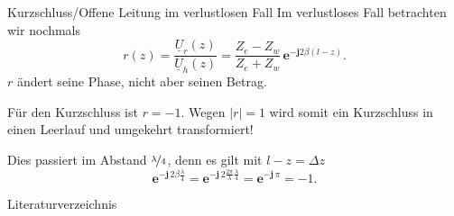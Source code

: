 \documentclass{beamer}
\begin{document}
\begin{frame}{Kurzschluss/Offene Leitung im verlustlosen Fall}
Im verlustloses Fall betrachten wir nochmals
\[
r(z) = \frac{\underline{U}_{r}(z)}{\underline{U}_{h}(z)} =
\frac{Z_{e}-Z_{w}}{Z_{e}+Z_{w}} \, \mathbf{e}^{-\mathbf{j} 2 \beta (l-z)}.
\]
$r$ ändert seine Phase, nicht aber seinen Betrag.
\vspace{1ex}

Für den Kurzschluss ist $r=-1$. Wegen $|r|=1$ wird somit ein Kurzschluss in einen Leerlauf und
umgekehrt transformiert!

\vspace{1ex}
Dies passiert im Abstand $\nicefrac{\lambda}{4}$, denn es gilt mit $l - z = \Delta z$
\[
\mathbf{e}^{- \mathbf{j} \, 2 \beta \frac{\lambda}{4}} =
\mathbf{e}^{- \mathbf{j} \, 2 \frac{2 \pi}{\lambda} \frac{\lambda}{4}} =
\mathbf{e}^{- \mathbf{j} \, \pi} = -1.
\]
\end{frame}


\begin{frame}{Literaturverzeichnis}
\printbibliography
\end{frame}
\end{document}
